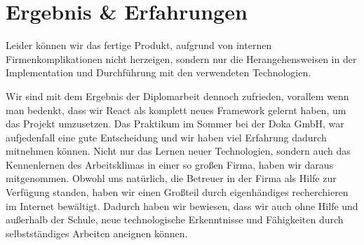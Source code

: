 \section{Ergebnis \& Erfahrungen}
Leider können wir das fertige Produkt, aufgrund von internen Firmenkomplikationen nicht 
herzeigen, sondern nur die Herangehensweisen in der Implementation und Durchführung mit den verwendeten
Technologien.

Wir sind mit dem Ergebnis der Diplomarbeit dennoch zufrieden, vorallem wenn man bedenkt, dass 
wir React als komplett neues Framework gelernt haben, um das Projekt 
umzusetzen. Das Praktikum im Sommer bei der Doka GmbH, war aufjedenfall
eine gute Entscheidung und wir haben viel Erfahrung dadurch mitnehmen können. 
Nicht nur das Lernen neuer Technologien, sondern auch das Kennenlernen des Arbeitsklimas in einer so 
großen Firma, haben wir daraus mitgenommen. Obwohl uns natürlich, die Betreuer in der Firma 
als Hilfe zur Verfügung standen, haben wir einen Großteil durch 
eigenhändiges recherchieren im Internet bewältigt. Dadurch haben wir bewiesen, dass wir auch 
ohne Hilfe und außerhalb der Schule, neue technologische Erkenntnisse und Fähigkeiten durch selbstständiges
Arbeiten aneignen können.
